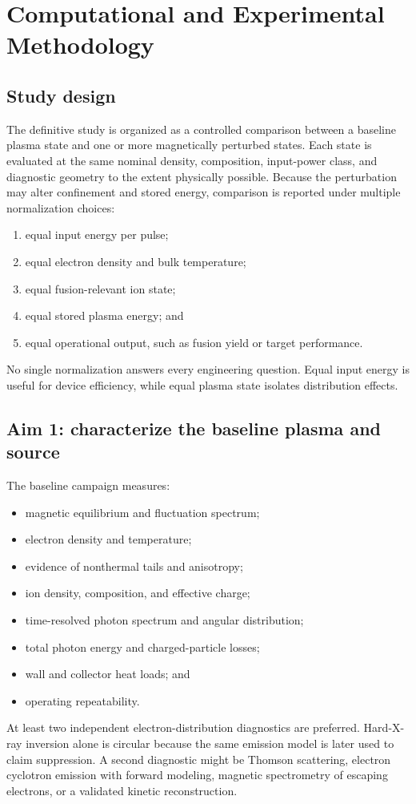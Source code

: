 \chapter{Computational and Experimental Methodology}
\label{ch:methodology}

\section{Study design}

The definitive study is organized as a controlled comparison between a baseline plasma state and one or more magnetically perturbed states. Each state is evaluated at the same nominal density, composition, input-power class, and diagnostic geometry to the extent physically possible. Because the perturbation may alter confinement and stored energy, comparison is reported under multiple normalization choices:
\begin{enumerate}
\item equal input energy per pulse;
\item equal electron density and bulk temperature;
\item equal fusion-relevant ion state;
\item equal stored plasma energy; and
\item equal operational output, such as fusion yield or target performance.
\end{enumerate}
No single normalization answers every engineering question. Equal input energy is useful for device efficiency, while equal plasma state isolates distribution effects.

\section{Aim 1: characterize the baseline plasma and source}

The baseline campaign measures:
\begin{itemize}
\item magnetic equilibrium and fluctuation spectrum;
\item electron density and temperature;
\item evidence of nonthermal tails and anisotropy;
\item ion density, composition, and effective charge;
\item time-resolved photon spectrum and angular distribution;
\item total photon energy and charged-particle losses;
\item wall and collector heat loads; and
\item operating repeatability.
\end{itemize}
At least two independent electron-distribution diagnostics are preferred. Hard-X-ray inversion alone is circular because the same emission model is later used to claim suppression. A second diagnostic might be Thomson scattering, electron cyclotron emission with forward modeling, magnetic spectrometry of escaping electrons, or a validated kinetic reconstruction.

